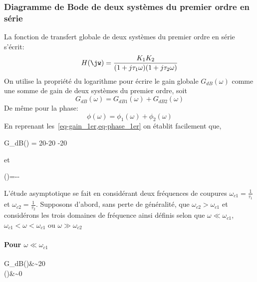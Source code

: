 \subsubsection{Diagramme de Bode de deux systèmes du premier ordre en série }
La fonction de transfert globale de deux systèmes du premier ordre en série 
s'écrit:
\begin{align}
    H(\jw)=\dfrac{K_1K_2}{(1+j\tau_1\omega)(1+j\tau_2\omega)}
    \label{eq-1er_serie}
\end{align}
On utilise la propriété du logarithme pour écrire le gain globale 
$G_{dB}(\omega)$ comme une somme de gain de deux systèmes du premier ordre, 
soit
\[
G_{dB}(\omega) = G_{dB1}(\omega) + G_{dB2}(\omega)
\]
De même pour la phase:
\[
\phi(\omega)= \phi_1(\omega) + \phi_2(\omega)
\]
En reprenant les~\cref{eq-gain_1er,eq-phase_1er} on établit facilement que,
\begin{bequation}
    G_{dB}(\omega) = 20-20
                    -20
\end{bequation}
et
\begin{bequation}
    \phi(\omega)=-\arctan{\tau_1\omega}-\arctan{\tau_2\omega}
\end{bequation}
L'étude asymptotique se fait en considérant deux fréquences de coupures 
$\omega_{c1}=\frac{1}{\tau_1}$ et $\omega_{c2}=\frac{1}{\tau_2}$.
Supposons d'abord, sans perte de généralité, que $\omega_{c2}>\omega_{c1}$ et 
considérons 
les trois domaines de fréquence ainsi définis selon que 
$\omega\ll\omega_{c1}$, $\omega_{c1}<\omega<\omega_{c1}$ ou 
$\omega\gg\omega_{c2}$
\paragraph{Pour $\omega\ll\omega_{c1}$}
\begin{bequation}
    G_{dB}(\omega)&\sim20\\
      \phi(\omega)&\sim0\degreeSI
\end{bequation}
